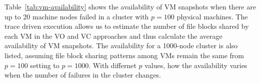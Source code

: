  Table~\ref{tab:vm-availability} shows the availability of VM snapshots when 
there are up to 20 machine nodes failed in a cluster with $p=100$ physical machines.
The trace driven execution allows us to estimate the number of file blocks shared by each VM in the VO and VC approaches
and thus calculate the average availability of VM snapshots.
The availability for  a 1000-node cluster is also listed, assuming file block sharing patterns among VMs remain
the same from $p=100$ setting to $p=1000$. With differnet $p$ values, how the availability varies when 
the number of failures in the cluster changes.


